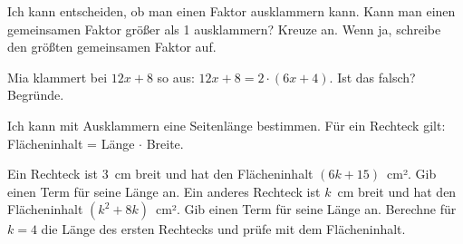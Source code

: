 \begin{aufgabe}{Ich kann entscheiden, ob man einen Faktor ausklammern kann. Kann man einen gemeinsamen Faktor größer als 1 ausklammern? Kreuze an. Wenn ja, schreibe den größten gemeinsamen Faktor auf.}
\begin{geruest}
\end{geruest}
\begin{teile}
\teil Mia klammert bei $12x + 8$ so aus: $12x + 8 = 2 \cdot (6x + 4)$. Ist das falsch? Begründe.
\end{teile}
\end{aufgabe}

\begin{aufgabe}{Ich kann mit Ausklammern eine Seitenlänge bestimmen. Für ein Rechteck gilt: Flächeninhalt = Länge $\cdot$ Breite.}
\begin{teile}
\teil Ein Rechteck ist $3$~cm breit und hat den Flächeninhalt $(6k + 15)$~cm². Gib einen Term für seine Länge an.
\teil Ein anderes Rechteck ist $k$~cm breit und hat den Flächeninhalt $(k^2 + 8k)$~cm². Gib einen Term für seine Länge an.
\teil Berechne für $k = 4$ die Länge des ersten Rechtecks und prüfe mit dem Flächeninhalt.
\end{teile}
\end{aufgabe}
